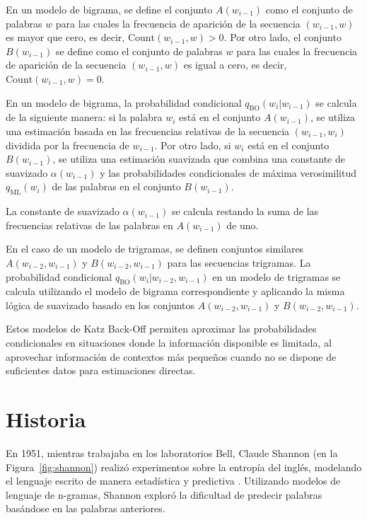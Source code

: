 En un modelo de bigrama, se define el conjunto $A(w_{i-1})$ como el conjunto de palabras $w$ para las cuales la frecuencia de aparición de la secuencia $(w_{i-1}, w)$ es mayor que cero, es decir, $\text{Count}(w_{i-1}, w) > 0$. Por otro lado, el conjunto $B(w_{i-1})$ se define como el conjunto de palabras $w$ para las cuales la frecuencia de aparición de la secuencia $(w_{i-1}, w)$ es igual a cero, es decir, $\text{Count}(w_{i-1}, w) = 0$.

En un modelo de bigrama, la probabilidad condicional $q_{\text{BO}}(w_i | w_{i-1})$ se calcula de la siguiente manera: si la palabra $w_i$ está en el conjunto $A(w_{i-1})$, se utiliza una estimación basada en las frecuencias relativas de la secuencia $(w_{i-1}, w_i)$ dividida por la frecuencia de $w_{i-1}$. Por otro lado, si $w_i$ está en el conjunto $B(w_{i-1})$, se utiliza una estimación suavizada que combina una constante de suavizado $\alpha(w_{i-1})$ y las probabilidades condicionales de máxima verosimilitud $q_{\text{ML}}(w_i)$ de las palabras en el conjunto $B(w_{i-1})$.

La constante de suavizado $\alpha(w_{i-1})$ se calcula restando la suma de las frecuencias relativas de las palabras en $A(w_{i-1})$ de uno.

En el caso de un modelo de trigramas, se definen conjuntos similares $A(w_{i-2}, w_{i-1})$ y $B(w_{i-2}, w_{i-1})$ para las secuencias trigramas. La probabilidad condicional $q_{\text{BO}}(w_i | w_{i-2}, w_{i-1})$ en un modelo de trigramas se calcula utilizando el modelo de bigrama correspondiente y aplicando la misma lógica de suavizado basado en los conjuntos $A(w_{i-2}, w_{i-1})$ y $B(w_{i-2}, w_{i-1})$.

Estos modelos de Katz Back-Off permiten aproximar las probabilidades condicionales en situaciones donde la información disponible es limitada, al aprovechar información de contextos más pequeños cuando no se dispone de suficientes datos para estimaciones directas.

\section{Historia}
En 1951, mientras trabajaba en los laboratorios Bell, Claude Shannon (en la Figura~\ref{fig:shannon}) realizó experimentos sobre la entropía del inglés, modelando el lenguaje escrito de manera estadística y predictiva \cite{shannon1951prediction}. Utilizando modelos de lenguaje de n-gramas, Shannon exploró la dificultad de predecir palabras basándose en las palabras anteriores.

